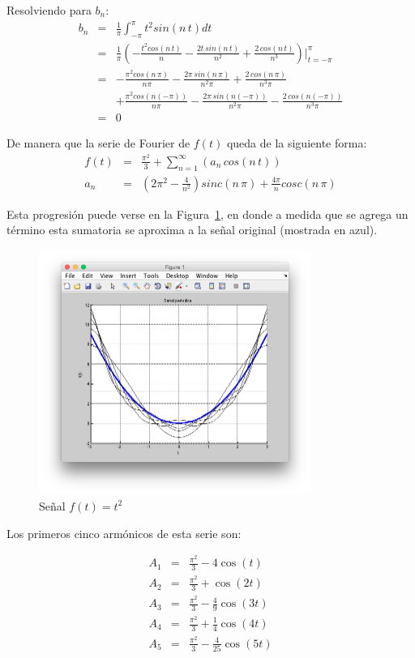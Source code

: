 \documentclass[a4paper]{article}
\begin{document}
Resolviendo para $b_n$:
\begin{eqnarray*}
b_n &=& \frac{1}{\pi}\int_{-\pi}^{\pi}t^2sin(n\,t)dt\\
&=& \frac{1}{\pi} \left(-\frac{t^2cos(n\,t)}{n} - \frac{2t\,sin(n\,t)}{n^2} + \frac{2\,cos(n\,t)}{n^3}\right)\bigg|_{t=-\pi}^{\pi}\\
&=& -\frac{\pi^2cos(n\,\pi)}{n\pi} - \frac{2\pi\,sin(n\,\pi)}{n^2\pi} + \frac{2\,cos(n\,\pi)}{n^3\pi}\\
& &+ \frac{\pi^2cos(n(-\pi))}{n\pi} - \frac{2\pi\,sin(n(-\pi))}{n^2\pi} - \frac{2\,cos(n(-\pi))}{n^3\pi}\\
&=& 0
\end{eqnarray*}

De manera que la serie de Fourier de $f(t)$ queda de la siguiente forma:
\begin{eqnarray*}
f(t) &=& \frac{\pi^2}{3} + \sum_{n=1}^\infty\left(a_n\,cos(n\,t)\right)\\
a_n &=& \left(2\pi^2  - \frac{4}{n^2} \right) sinc(n\,\pi) + \frac{4\pi}{n}cosc(n\,\pi)
\end{eqnarray*}

Esta progresión puede verse en la Figura~\ref{fig_1}, en donde a medida que se agrega un término esta sumatoria se aproxima a la señal original (mostrada en azul).

\begin{figure}[!t]
\centering
\includegraphics[width=3.5in]{imgs/sqrt.png}
\caption{Señal $f(t) = t^2$}
\label{fig_1}
\end{figure}

Los primeros cinco armónicos de esta serie son:

\begin{eqnarray*}
A_1 &=& \frac{\pi^2}{3} - 4\cos{(t)} \\
A_2 &=& \frac{\pi^2}{3} + \cos{(2t)} \\
A_3 &=& \frac{\pi^2}{3} - \frac{4}{9}\cos{(3t)} \\
A_4 &=& \frac{\pi^2}{3} + \frac{1}{4}\cos{(4t)} \\
A_5 &=& \frac{\pi^2}{3} - \frac{4}{25}\cos{(5t)}
\end{eqnarray*}
\end{document}
